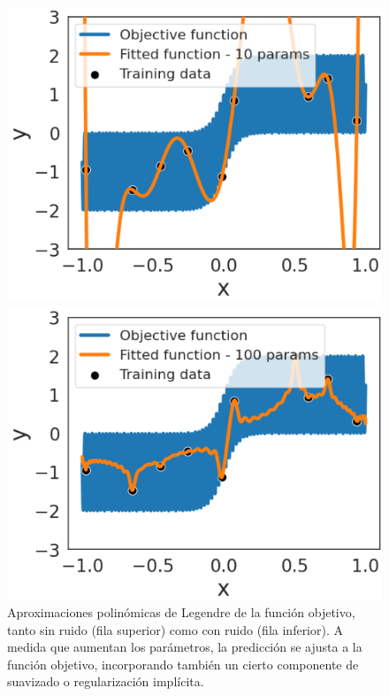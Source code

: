 \begin{figure}[h]
    \begin{minipage}{0.32\textwidth}
        \centering
        \includegraphics[width=\linewidth]{img/experiments/hiperbolica_noise1.2.png}
    \end{minipage}
    \begin{minipage}{0.32\textwidth}
        \centering
        \includegraphics[width=\linewidth]{img/experiments/hiperbolica_noise1.3.png}
    \end{minipage}
    \caption[Aproximaciones polinómicas de Legendre de la función objetivo, tanto sin ruido como con ruido.]{Aproximaciones polinómicas de Legendre de la función objetivo, tanto sin ruido (fila superior) como con ruido (fila inferior). A medida que aumentan los parámetros, la predicción se ajusta a la función objetivo, incorporando también un cierto componente de suavizado o regularización implícita.}\label{fig:approx-hiperbolicas}
\end{figure}

